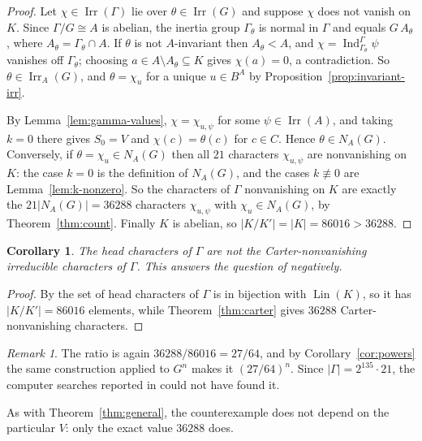 \documentclass[11pt]{article}
\newtheorem{corollary}[theorem]{Corollary}
\theoremstyle{definition}
\theoremstyle{remark}
\newtheorem{remark}[theorem]{Remark}
\newcommand{\Irr}{\operatorname{Irr}}
\newcommand{\Ind}{\operatorname{Ind}}
\begin{document}
\begin{proof}
Let $\chi\in\Irr(\Gamma)$ lie over $\theta\in\Irr(G)$ and suppose
$\chi$ does not vanish on $K$.  Since $\Gamma/G\cong A$ is abelian,
the inertia group $\Gamma_\theta$ is normal in $\Gamma$ and equals
$G\,A_\theta$, where $A_\theta=\Gamma_\theta\cap A$.  If $\theta$ is not
$A$-invariant then $A_\theta<A$, and $\chi=\Ind_{\Gamma_\theta}^\Gamma\psi$
vanishes off $\Gamma_\theta$; choosing $a\in A\setminus A_\theta\subseteq K$
gives $\chi(a)=0$, a contradiction.  So $\theta\in\Irr_A(G)$, and
$\theta=\chi_u$ for a unique $u\in B^A$ by
Proposition~\ref{prop:invariant-irr}.

By Lemma~\ref{lem:gamma-values}, $\chi=\chi_{u,\psi}$ for some
$\psi\in\Irr(A)$, and taking $k=0$ there gives $S_0=V$ and
$\chi(c)=\theta(c)$ for $c\in C$.  Hence $\theta\in N_A(G)$.
Conversely, if $\theta=\chi_u\in N_A(G)$ then all $21$ characters
$\chi_{u,\psi}$ are nonvanishing on $K$: the case $k=0$ is the
definition of $N_A(G)$, and the cases $k\not\equiv0$ are
Lemma~\ref{lem:k-nonzero}.  So the characters of $\Gamma$ nonvanishing
on $K$ are exactly the $21|N_A(G)|=36288$ characters $\chi_{u,\psi}$
with $\chi_u\in N_A(G)$, by Theorem~\ref{thm:count}.  Finally $K$ is
abelian, so $|K/K'|=|K|=86016>36288$.
\end{proof}

\begin{corollary}\label{cor:carter-head}
The head characters of $\Gamma$ are not the Carter-nonvanishing
irreducible characters of $\Gamma$.  This answers the question of
\cite[\S6]{isaacs-carter} negatively.
\end{corollary}

\begin{proof}
By \cite[Theorem A]{isaacs-carter} the set of head characters of
$\Gamma$ is in bijection with $\operatorname{Lin}(K)$, so it has
$|K/K'|=86016$ elements, while Theorem~\ref{thm:carter} gives $36288$
Carter-nonvanishing characters.
\end{proof}

\begin{remark}
The ratio is again $36288/86016=27/64$, and by
Corollary~\ref{cor:powers} the same construction applied to $G^n$ makes
it $(27/64)^n$.  Since $|\Gamma|=2^{135}\cdot21$, the computer searches
reported in \cite[\S6]{isaacs-carter} could not have found it.
\end{remark}

As with Theorem~\ref{thm:general}, the counterexample does not depend on
the particular $V$: only the exact value $36288$ does.
\end{document}
